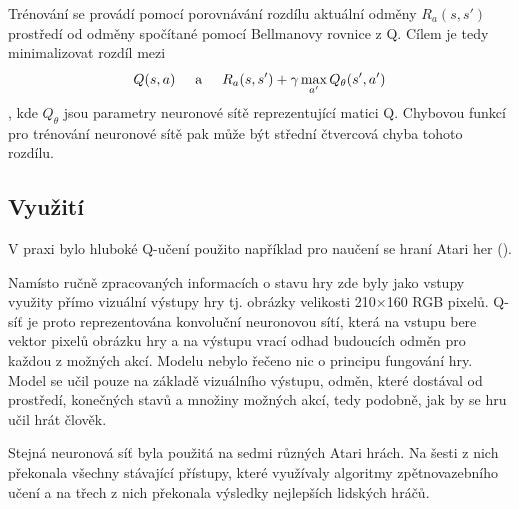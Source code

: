 Trénování se provádí pomocí porovnávání rozdílu aktuální odměny $R_a(s,s')$ prostředí od odměny spočítané pomocí Bellmanovy rovnice z Q.
Cílem je tedy minimalizovat rozdíl mezi \[Q(s,a) \hspace{5mm}\text{a}\hspace{5mm}  R_a(s,s') + \gamma\max_{a'}Q_{\theta}(s',a')\], kde $Q_{\theta}$ jsou parametry neuronové sítě reprezentující matici Q.
Chybovou funkcí pro trénování neuronové sítě pak může být střední čtvercová chyba tohoto rozdílu.



\subsection{Využití}
V praxi bylo hluboké Q-učení použito například pro naučení se hraní Atari her (\cite{atari}). 


Namísto ručně zpracovaných informacích o stavu hry zde byly jako vstupy využity přímo vizuální výstupy hry tj. obrázky velikosti 210×160 RGB pixelů.
Q-síť je proto reprezentována konvoluční neuronovou sítí, která na vstupu bere vektor pixelů obrázku hry a na výstupu vrací odhad budoucích odměn pro každou z možných akcí.
Modelu nebylo řečeno nic o principu fungování hry. Model se učil pouze na základě vizuálního výstupu, odměn, které dostával od prostředí, konečných stavů a množiny možných akcí, tedy podobně, jak by se hru učil hrát člověk.

Stejná neuronová síť byla použitá na sedmi různých Atari hrách. Na šesti z nich překonala všechny stávající přístupy, které využívaly algoritmy zpětnovazebního učení a na třech z nich překonala výsledky nejlepších lidských hráčů.


